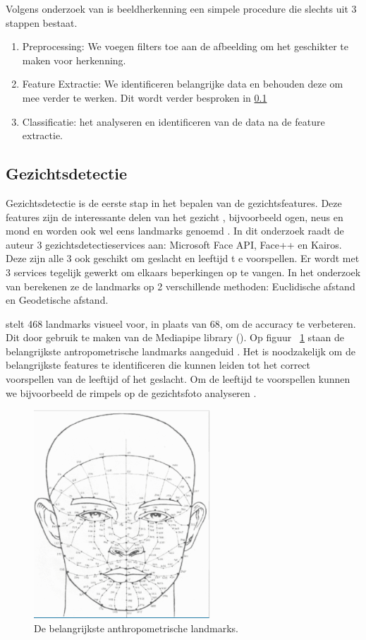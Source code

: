Volgens onderzoek van \textcite{Basystiuk2023} is beeldherkenning een simpele procedure die slechts uit 3 stappen bestaat. 
\begin{enumerate}
    \item{Preprocessing: We voegen filters toe aan de afbeelding om het geschikter te maken voor herkenning.}
    \item{Feature Extractie: We identificeren belangrijke data en behouden deze om mee verder te werken. Dit wordt verder besproken in \ref{sub:vgezichtsdetectie}}
    \item{Classificatie: het analyseren en identificeren van de  data na de feature extractie.}
\end{enumerate}

\subsection{Gezichtsdetectie}\label{sub:vgezichtsdetectie}
Gezichtsdetectie is de eerste stap in het bepalen van de gezichtsfeatures. Deze features zijn de interessante delen van het gezicht , bijvoorbeeld ogen, neus en mond en worden ook wel eens landmarks genoemd \autocite{Coppens2018}. In dit onderzoek raadt de auteur 3 gezichtsdetectieservices aan: Microsoft Face API, Face++ en Kairos. Deze zijn alle 3 ook geschikt om geslacht en leeftijd t
e voorspellen. Er wordt met 3 services tegelijk gewerkt om elkaars beperkingen op te vangen.
In het onderzoek van \textcite{Sanil2023} berekenen ze de landmarks op 2 verschillende methoden: Euclidische afstand en Geodetische afstand.

\textcite{Sanil2023} stelt 468 landmarks visueel voor, in plaats van 68, om de accuracy te verbeteren. Dit door gebruik te maken van de Mediapipe library (\textcite{Zubair2021}). Op figuur {~\ref{fig:vlandmarks}} staan de belangrijkste antropometrische landmarks aangeduid . Het is noodzakelijk om de belangrijkste features te identificeren die kunnen leiden tot het correct voorspellen van de leeftijd of het geslacht. Om de leeftijd te voorspellen kunnen we bijvoorbeeld de rimpels op de gezichtsfoto analyseren \autocite{Kwon1994}. 
\begin{figure}
    \centering
    \includegraphics{graphics/faciallandmarks.png}
    \caption[Belangrijkste anthropometrische landmarks]{\label{fig:vlandmarks}De belangrijkste anthropometrische landmarks\autocite{Sanil2023}.}
\end{figure}

